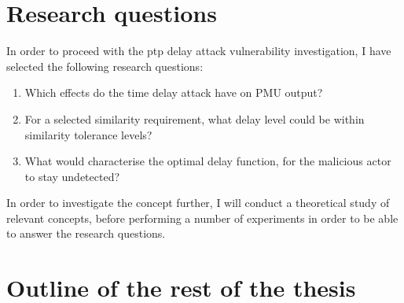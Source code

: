 \section{Research questions}
In order to proceed with the \acrshort{ptp} delay attack vulnerability investigation, I have selected the following research questions:

\begin{enumerate}
    \item Which effects do the time delay attack have on PMU output?
    \item For a selected similarity requirement, what delay level could be within similarity tolerance levels?
    \item What would characterise the optimal delay function, for the malicious actor to stay undetected?    

\end{enumerate}


In order to investigate the concept further, I will conduct a theoretical study of relevant concepts, before performing a number of experiments in order to be able to answer the research questions. 



\section{Outline of the rest of the thesis}



